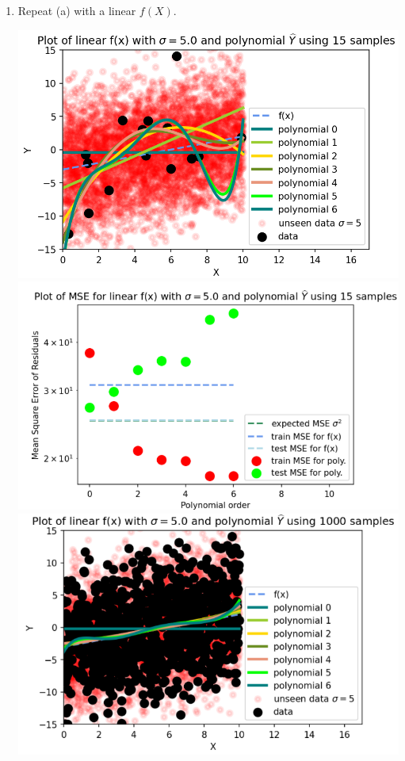 \documentclass[12pt]{article}
\begin{document}
\begin{enumerate}[label=(\alph*)]
\begin{enumerate}[label=(\roman*)]
          \end{enumerate}
          \pagebreak
    \item Repeat (a) with a linear $f(X)$.
          \begin{center}
              \includegraphics[width=1\textwidth]{linear-15.png}
              \includegraphics[width=1\textwidth]{linear-MSE-15.png}
              \includegraphics[width=1\textwidth]{linear-1000.png}

\end{center}
\end{enumerate}
\end{document}
